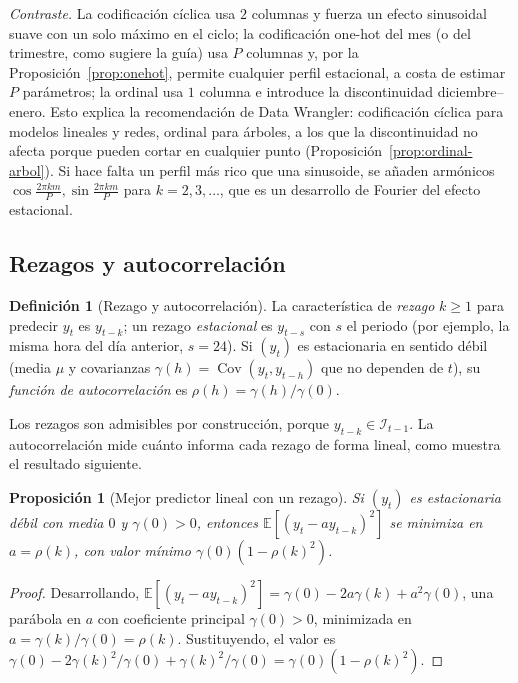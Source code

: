 \documentclass[11pt]{article}
\newtheorem{proposicion}[teorema]{Proposición}
\theoremstyle{definition}
\newtheorem{definicion}[teorema]{Definición}
\theoremstyle{remark}
\newcommand{\E}{\mathbb{E}}
\DeclareMathOperator{\Cov}{Cov}
\begin{document}
\noindent \emph{Contraste.} La codificación cíclica usa $2$ columnas y fuerza un efecto sinusoidal suave con un solo máximo en el ciclo; la codificación one-hot del mes (o del trimestre, como sugiere la guía) usa $P$ columnas y, por la Proposición~\ref{prop:onehot}, permite cualquier perfil estacional, a costa de estimar $P$ parámetros; la ordinal usa $1$ columna e introduce la discontinuidad diciembre--enero. Esto explica la recomendación de Data Wrangler: codificación cíclica para modelos lineales y redes, ordinal para árboles, a los que la discontinuidad no afecta porque pueden cortar en cualquier punto (Proposición~\ref{prop:ordinal-arbol}). Si hace falta un perfil más rico que una sinusoide, se añaden armónicos $\cos\frac{2\pi km}{P},\sin\frac{2\pi km}{P}$ para $k=2,3,\dots$, que es un desarrollo de Fourier del efecto estacional.

\subsection{Rezagos y autocorrelación}\label{sec:rezagos}

\begin{definicion}[Rezago y autocorrelación]\label{def:rezago}
\noindent La característica de \emph{rezago} $k\ge1$ para predecir $y_t$ es $y_{t-k}$; un rezago \emph{estacional} es $y_{t-s}$ con $s$ el periodo (por ejemplo, la misma hora del día anterior, $s=24$). Si $(y_t)$ es estacionaria en sentido débil (media $\mu$ y covarianzas $\gamma(h)=\Cov(y_t,y_{t-h})$ que no dependen de $t$), su \emph{función de autocorrelación} es $\rho(h)=\gamma(h)/\gamma(0)$.
\end{definicion}

\noindent Los rezagos son admisibles por construcción, porque $y_{t-k}\in\mathcal{I}_{t-1}$. La autocorrelación mide cuánto informa cada rezago de forma lineal, como muestra el resultado siguiente.

\begin{proposicion}[Mejor predictor lineal con un rezago]\label{prop:lag1}
\noindent Si $(y_t)$ es estacionaria débil con media $0$ y $\gamma(0)>0$, entonces $\E[(y_t-ay_{t-k})^2]$ se minimiza en $a=\rho(k)$, con valor mínimo $\gamma(0)(1-\rho(k)^2)$.
\end{proposicion}
\begin{proof}
\noindent Desarrollando, $\E[(y_t-ay_{t-k})^2]=\gamma(0)-2a\gamma(k)+a^2\gamma(0)$, una parábola en $a$ con coeficiente principal $\gamma(0)>0$, minimizada en $a=\gamma(k)/\gamma(0)=\rho(k)$. Sustituyendo, el valor es $\gamma(0)-2\gamma(k)^2/\gamma(0)+\gamma(k)^2/\gamma(0)=\gamma(0)(1-\rho(k)^2)$.
\end{proof}
\end{document}
